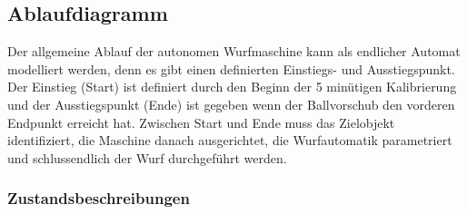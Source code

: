\subsection{Ablaufdiagramm}
\label{ss_ablaufdiagramm}

Der allgemeine Ablauf der autonomen Wurfmaschine kann als endlicher Automat
modelliert werden, denn es gibt einen definierten Einstiegs- und 
Ausstiegspunkt. Der Einstieg (Start) ist definiert durch den Beginn der 5 minütigen Kalibrierung und der Ausstiegspunkt (Ende) ist gegeben wenn der Ballvorschub den vorderen Endpunkt erreicht hat. Zwischen Start und Ende muss das Zielobjekt
identifiziert, die Maschine danach ausgerichtet, die Wurfautomatik
parametriert und schlussendlich der Wurf durchgeführt werden.



\subsubsection{Zustandsbeschreibungen}
